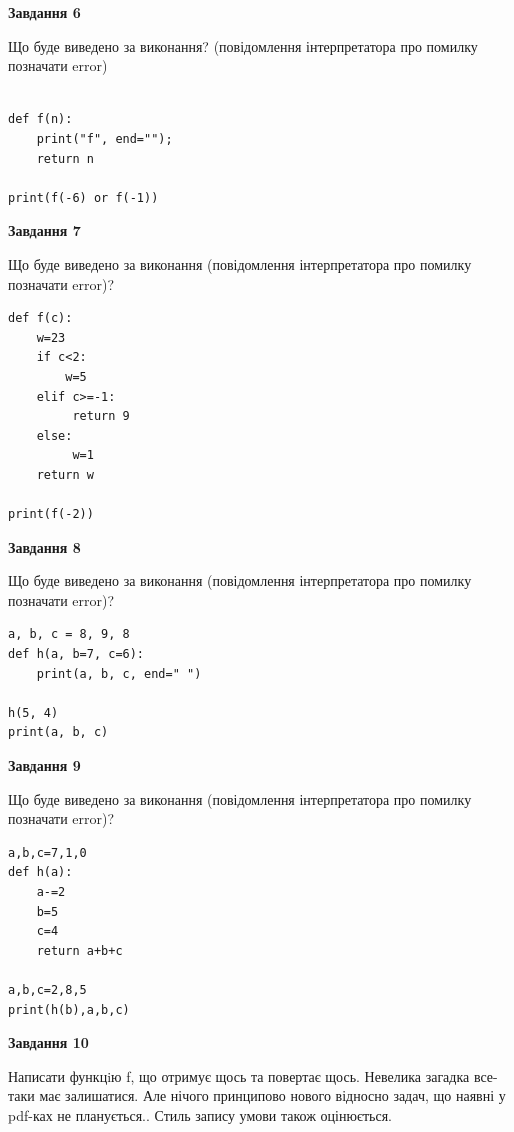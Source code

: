 \documentclass[12pt, ukrainian]{article}
\begin{document}
{\begin {large}
{\begin {center}\textbf{Завдання 6}\end {center}}

Що буде виведено за виконання? (повідомлення інтерпретатора про помилку позначати error)\par
\begin{verbatim}

def f(n):
    print("f", end="");
    return n

print(f(-6) or f(-1))
\end{verbatim}

{\begin {center}\textbf{Завдання 7}\end {center}}

Що буде виведено за виконання (повідомлення інтерпретатора про помилку позначати error)?\par
\begin{verbatim}
def f(c):
    w=23
    if c<2: 
        w=5
    elif c>=-1:
         return 9
    else:
         w=1
    return w

print(f(-2))
\end{verbatim}

{\begin {center}\textbf{Завдання 8}\end {center}}

Що буде виведено за виконання (повідомлення інтерпретатора про помилку позначати error)?\par
\begin{verbatim}
a, b, c = 8, 9, 8
def h(a, b=7, c=6):
    print(a, b, c, end=" ")

h(5, 4)
print(a, b, c)
\end{verbatim}

{\begin {center}\textbf{Завдання 9}\end {center}}

Що буде виведено за виконання (повідомлення інтерпретатора про помилку позначати error)?\par
\begin{verbatim}
a,b,c=7,1,0
def h(a):
    a-=2
    b=5
    c=4
    return a+b+c

a,b,c=2,8,5
print(h(b),a,b,c)
\end{verbatim}

{\begin {center}\textbf{Завдання 10}\end {center}}


Написати функцiю f, що отримує щось та повертає щось. Невелика загадка все-таки має залишатися. Але нічого принципово нового відносно задач, що наявні у pdf-ках не планується.. Стиль запису умови також оцінюється.\par
\end {large}}
\newpage
\end{document}
